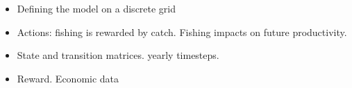 \documentclass[11pt]{article}
\begin{document}
\begin{itemize}
\item Defining the model on a discrete grid
\item Actions: fishing is rewarded by catch. Fishing impacts on future productivity.
\item State and transition matrices. yearly timesteps.
\item Reward. Economic data
  
\end{itemize}

\\
\end{document}

